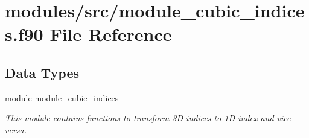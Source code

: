 \hypertarget{module__cubic__indices_8f90}{
\section{modules/src/module\-\_\-cubic\-\_\-indices.f90 \-File \-Reference}
\label{module__cubic__indices_8f90}
}
\subsection*{\-Data \-Types}
\begin{DoxyCompactItemize}
\item 
module \hyperlink{classmodule__cubic__indices}{module\-\_\-cubic\-\_\-indices}
\begin{DoxyCompactList}\small\item\em \-This module contains functions to transform 3\-D indices to 1\-D index and vice versa. \end{DoxyCompactList}\end{DoxyCompactItemize}
